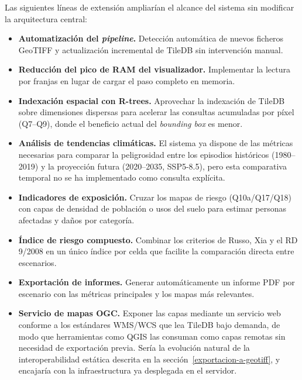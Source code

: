 Las siguientes líneas de extensión ampliarían el alcance del sistema sin modificar la arquitectura central:

\begin{itemize}
\item \textbf{Automatización del \textit{pipeline}.} Detección automática de nuevos ficheros GeoTIFF y actualización incremental de TileDB sin intervención manual.

\item \textbf{Reducción del pico de RAM del visualizador.} Implementar la lectura por franjas en lugar de cargar el paso completo en memoria.

\item \textbf{Indexación espacial con R-trees.} Aprovechar la indexación de TileDB sobre dimensiones dispersas para acelerar las consultas acumuladas por píxel (Q7--Q9), donde el beneficio actual del \textit{bounding box} es menor.

\item \textbf{Análisis de tendencias climáticas.} El sistema ya dispone de las métricas necesarias para comparar la peligrosidad entre los episodios históricos (1980--2019) y la proyección futura (2020--2035, SSP5-8.5), pero esta comparativa temporal no se ha implementado como consulta explícita.

\item \textbf{Indicadores de exposición.} Cruzar los mapas de riesgo (Q10a/Q17/Q18) con capas de densidad de población o usos del suelo para estimar personas afectadas y daños por categoría.

\item \textbf{Índice de riesgo compuesto.} Combinar los criterios de Russo, Xia y el RD 9/2008 en un único índice por celda que facilite la comparación directa entre escenarios.

\item \textbf{Exportación de informes.} Generar automáticamente un informe PDF por escenario con las métricas principales y los mapas más relevantes.

\item \textbf{Servicio de mapas OGC.} Exponer las capas mediante un servicio web conforme a los estándares WMS/WCS que lea TileDB bajo demanda, de modo que herramientas como QGIS las consuman como capas remotas sin necesidad de exportación previa. Sería la evolución natural de la interoperabilidad estática descrita en la sección~\ref{exportacion-a-geotiff}, y encajaría con la infraestructura ya desplegada en el servidor.
\end{itemize}

